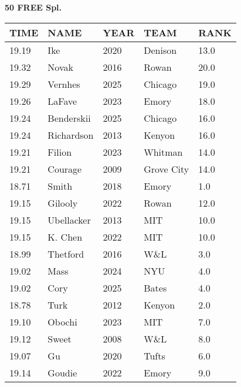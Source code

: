 \begin{center}
\begin{minipage}[t]{0.7\textwidth}
\centering
\textbf{50 FREE Spl.}\\[0.05cm]
\begin{tabular}{@{}p{1.8cm}p{2.8cm}p{1.2cm}p{1.4cm}p{0.8cm}@{}}
\hline
\textbf{TIME} & \textbf{NAME} & \textbf{YEAR} & \textbf{TEAM} & \textbf{RANK} \\
\hline
19.19 & Ike & 2020 & Denison & 13.0 \\
19.32 & Novak & 2016 & Rowan & 20.0 \\
19.29 & Vernhes & 2025 & Chicago & 19.0 \\
19.26 & LaFave & 2023 & Emory & 18.0 \\
19.24 & Benderskii & 2025 & Chicago & 16.0 \\
19.24 & Richardson & 2013 & Kenyon & 16.0 \\
19.21 & Filion & 2023 & Whitman & 14.0 \\
19.21 & Courage & 2009 & Grove City & 14.0 \\
18.71 & Smith & 2018 & Emory & 1.0 \\
19.15 & Gilooly & 2022 & Rowan & 12.0 \\
19.15 & Ubellacker & 2013 & MIT & 10.0 \\
19.15 & K. Chen & 2022 & MIT & 10.0 \\
18.99 & Thetford & 2016 & W\&L & 3.0 \\
19.02 & Mass & 2024 & NYU & 4.0 \\
19.02 & Cory & 2025 & Bates & 4.0 \\
18.78 & Turk & 2012 & Kenyon & 2.0 \\
19.10 & Obochi & 2023 & MIT & 7.0 \\
19.12 & Sweet & 2008 & W\&L & 8.0 \\
19.07 & Gu & 2020 & Tufts & 6.0 \\
19.14 & Goudie & 2022 & Emory & 9.0 \\
\hline
\end{tabular}
\end{minipage}
\end{center}

\vspace{0.4cm}

